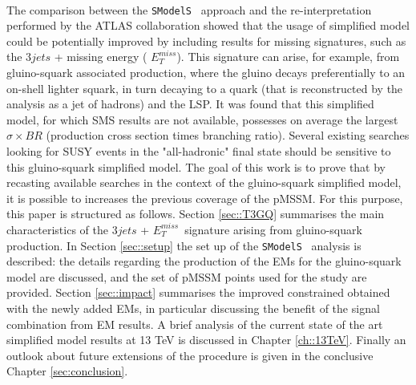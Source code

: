\documentclass[a4paper,11pt]{article}
\newcommand{\MET}{{ $E_T ^{miss}$}}
\newcommand{\SMO}{\texttt{SModelS\xspace}}
\begin{document}
\\
The comparison between the \SMO~ approach and the re-interpretation performed by the ATLAS collaboration showed that the usage of simplified model could be potentially improved by including results for missing signatures, such as the $3jets$ + missing energy (\MET). 
This signature can arise, for example, from gluino-squark associated production, where the gluino decays preferentially to an on-shell lighter squark, in turn decaying to a quark (that is reconstructed by the analysis as a jet of hadrons) and the LSP. It was found that this simplified model, for which SMS results are not available, possesses on average the largest $\sigma \times BR$ (production cross section  times branching ratio). Several existing searches looking for SUSY events in the "all-hadronic" final state should be sensitive to this gluino-squark simplified model. The goal of this work is to prove that by recasting available searches in the context of the gluino-squark simplified model, it is possible to increases the previous coverage of the pMSSM. For this purpose, this paper is structured as follows. Section \ref{sec::T3GQ} summarises the main characteristics of the $3jets$ + \MET~signature arising from gluino-squark production. In Section \ref{sec::setup} the set up of the \SMO~ analysis is described: the details regarding the production of the EMs for the gluino-squark model are discussed, and the set of pMSSM points used for the study are provided. Section \ref{sec::impact} summarises the improved constrained obtained with the newly added EMs, in particular discussing the benefit of the signal combination from EM results. A brief analysis of the current state of the art simplified model results at 13 TeV is discussed in Chapter \ref{ch::13TeV}. Finally an outlook about future extensions of the procedure is given in the conclusive Chapter \ref{sec:conclusion}.  
%
\end{document}
